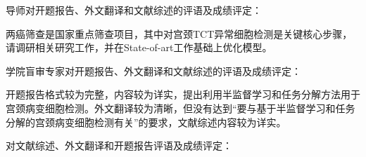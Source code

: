\cleardoublepage

{
    \bfseries

    {
        \noindent 导师对开题报告、外文翻译和文献综述的评语及成绩评定：
    }
    \par 两癌筛查是国家重点筛查项目，其中对宫颈TCT异常细胞检测是关键核心步骤，请调研相关研究工作，并在State-of-art工作基础上优化模型。


    \vspace{50mm}
    \thesisproposaleval[8][13][4]
    \signature{导师签名}

    {
        \noindent 学院盲审专家对开题报告、外文翻译和文献综述的评语及成绩评定：
    }
    \par 开题报告格式较为完整，内容较为详实，提出利用半监督学习和任务分解方法用于宫颈病变细胞检测。外文翻译较为清晰，但没有达到“要与基于半监督学习和任务分解的宫颈病变细胞检测有关”的要求，文献综述内容较为详实。


    \mbox{} \vfill
    \thesisproposaleval[8][13][4]
    \signature{开题报告审核负责人（签名/签章）}
}
{
    \bfseries

    {
        \noindent 对文献综述、外文翻译和开题报告评语及成绩评定：
    }


    \mbox{} \vfill
    \thesisproposaleval
    \signature{开题报告答辩小组负责人（签名）}
}
